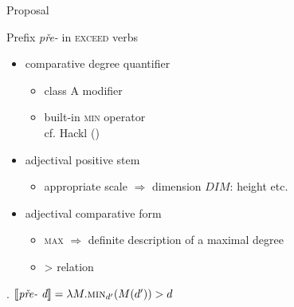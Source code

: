 \documentclass[12pt]{beamer}
\begin{document}
\begin{frame}{Proposal}

Prefix \textit{pře-} in \textsc{exceed} verbs 
\begin{itemize}
\item comparative degree quantifier
\begin{itemize}
\item class A modifier
\item built-in \textsc{min} operator\\\scriptsize cf. Hackl (\citeyear{hackl2001comparative})\normalsize
\end{itemize}
\item adjectival positive stem 
\begin{itemize}
\item appropriate scale $\Rightarrow$ dimension $DIM$: height etc.
\end{itemize}
\item adjectival comparative form
\begin{itemize}
\item \textsc{max} $\Rightarrow$ definite description of a maximal degree
\item > relation
\end{itemize}

\end{itemize}

\ex. $\llbracket\textit{pře-~d}\rrbracket = \lambda M.\textsc{min}_{d'}(M(d'))>d$\label{ex:pre-semantics} 

\end{frame}
\end{document}
